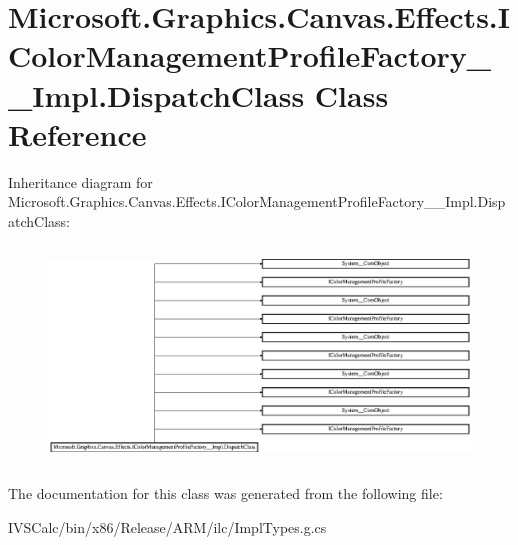 \hypertarget{class_microsoft_1_1_graphics_1_1_canvas_1_1_effects_1_1_i_color_management_profile_factory_____impl_1_1_dispatch_class}{}\section{Microsoft.\+Graphics.\+Canvas.\+Effects.\+I\+Color\+Management\+Profile\+Factory\+\_\+\+\_\+\+Impl.\+Dispatch\+Class Class Reference}
\label{class_microsoft_1_1_graphics_1_1_canvas_1_1_effects_1_1_i_color_management_profile_factory_____impl_1_1_dispatch_class}
Inheritance diagram for Microsoft.\+Graphics.\+Canvas.\+Effects.\+I\+Color\+Management\+Profile\+Factory\+\_\+\+\_\+\+Impl.\+Dispatch\+Class\+:\begin{figure}[H]
\begin{center}
\leavevmode
\includegraphics[height=5.822306cm]{class_microsoft_1_1_graphics_1_1_canvas_1_1_effects_1_1_i_color_management_profile_factory_____impl_1_1_dispatch_class}
\end{center}
\end{figure}


The documentation for this class was generated from the following file\+:\begin{DoxyCompactItemize}
\item 
I\+V\+S\+Calc/bin/x86/\+Release/\+A\+R\+M/ilc/Impl\+Types.\+g.\+cs\end{DoxyCompactItemize}
